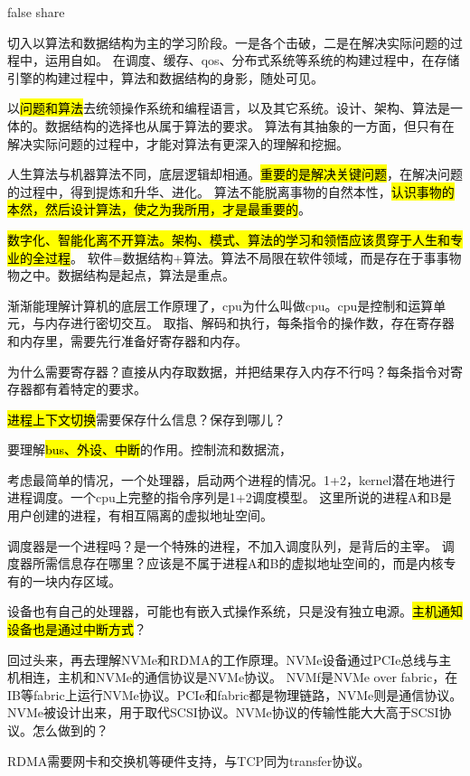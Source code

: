 false share

\hrulefill

切入以算法和数据结构为主的学习阶段。一是各个击破，二是在解决实际问题的过程中，运用自如。
在调度、缓存、qos、分布式系统等系统的构建过程中，在存储引擎的构建过程中，算法和数据结构的身影，随处可见。

以\hl{问题和算法}去统领操作系统和编程语言，以及其它系统。设计、架构、算法是一体的。数据结构的选择也从属于算法的要求。
算法有其抽象的一方面，但只有在解决实际问题的过程中，才能对算法有更深入的理解和挖掘。

人生算法与机器算法不同，底层逻辑却相通。\hl{重要的是解决关键问题}，在解决问题的过程中，得到提炼和升华、进化。
算法不能脱离事物的自然本性，\hl{认识事物的本然，然后设计算法，使之为我所用，才是最重要的}。

\hl{数字化、智能化离不开算法。架构、模式、算法的学习和领悟应该贯穿于人生和专业的全过程}。
软件=数据结构+算法。算法不局限在软件领域，而是存在于事事物物之中。数据结构是起点，算法是重点。

\dotfill

渐渐能理解计算机的底层工作原理了，cpu为什么叫做cpu。cpu是控制和运算单元，与内存进行密切交互。
取指、解码和执行，每条指令的操作数，存在寄存器和内存里，需要先行准备好寄存器和内存。

为什么需要寄存器？直接从内存取数据，并把结果存入内存不行吗？每条指令对寄存器都有着特定的要求。

\hl{进程上下文切换}需要保存什么信息？保存到哪儿？

要理解\hl{bus、外设、中断}的作用。控制流和数据流，

考虑最简单的情况，一个处理器，启动两个进程的情况。1+2，kernel潜在地进行进程调度。一个cpu上完整的指令序列是1+2调度模型。
这里所说的进程A和B是用户创建的进程，有相互隔离的虚拟地址空间。

调度器是一个进程吗？是一个特殊的进程，不加入调度队列，是背后的主宰。
调度器所需信息存在哪里？应该是不属于进程A和B的虚拟地址空间的，而是内核专有的一块内存区域。

设备也有自己的处理器，可能也有嵌入式操作系统，只是没有独立电源。\hl{主机通知设备也是通过中断方式}？

\dotfill

回过头来，再去理解NVMe和RDMA的工作原理。NVMe设备通过PCIe总线与主机相连，主机和NVMe的通信协议是NVMe协议。
NVMf是NVMe over fabric，在IB等fabric上运行NVMe协议。PCIe和fabric都是物理链路，NVMe则是通信协议。
NVMe被设计出来，用于取代SCSI协议。NVMe协议的传输性能大大高于SCSI协议。怎么做到的？

RDMA需要网卡和交换机等硬件支持，与TCP同为transfer协议。

